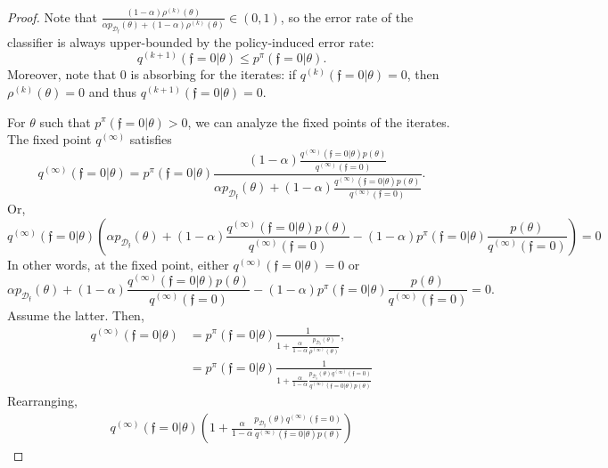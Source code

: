 \documentclass[10pt,a4paper]{amsart}
\newcommand{\MeasuredCISet}{\mathcal{D}_{\feas{}}}
\newcommand{\feas}{\mathfrak{f}}
\begin{document}
\begin{proof}
Note that $\frac{ (1-\alpha) \rho^{(k)}(\theta) }{ \alpha p_{\MeasuredCISet}(\theta) + (1-\alpha) \rho^{(k)}(\theta) } \in (0, 1)$, so the error rate of the classifier is always upper-bounded by the policy-induced error rate:
\begin{equation}
    q^{(k+1)}(\feas{}=0 | \theta) \leq p^\pi(\feas{}=0 | \theta).
\end{equation}
Moreover, note that $0$ is absorbing for the iterates: if $q^{(k)}(\feas{}=0 | \theta) = 0$, then $\rho^{(k)}(\theta) = 0$ and thus $q^{(k+1)}(\feas{}=0 | \theta) = 0$.

For $\theta$ such that $p^\pi(\feas{}=0 | \theta) > 0$, we can analyze the fixed points of the iterates. The fixed point $q^{(\infty)}$ satisfies
\begin{equation}
    q^{(\infty)}(\feas{}=0 | \theta) = p^\pi(\feas{}=0 | \theta) \frac{ (1-\alpha) \frac{q^{(\infty)}(\feas{}=0|\theta) p(\theta) }{q^{(\infty)}(\feas{}=0)} }{ \alpha p_{\MeasuredCISet}(\theta) + (1-\alpha) \frac{q^{(\infty)}(\feas{}=0|\theta) p(\theta)}{q^{(\infty)}(\feas{}=0)} }.
\end{equation}
Or,
\begin{equation}
    q^{(\infty)}(\feas{}=0 | \theta)
    \left( \alpha p_{\MeasuredCISet}(\theta) + (1 - \alpha) \frac{ q^{(\infty)}(\feas{}=0|\theta) p(\theta) }{ q^{(\infty)}(\feas{}=0) } - (1-\alpha) p^\pi(\feas{}=0|\theta) \frac{p(\theta)}{q^{(\infty)}(\feas{}=0)} \right) = 0
\end{equation}
In other words, at the fixed point, either $q^{(\infty)}(\feas{}=0 | \theta) = 0$ or
\begin{equation}
    \alpha p_{\MeasuredCISet}(\theta) + (1 - \alpha) \frac{ q^{(\infty)}(\feas{}=0|\theta) p(\theta) }{ q^{(\infty)}(\feas{}=0) } - (1-\alpha) p^\pi(\feas{}=0|\theta) \frac{p(\theta)}{q^{(\infty)}(\feas{}=0)} = 0.
\end{equation}
Assume the latter. Then,
\begin{align}
    q^{(\infty)}(\feas{}=0 | \theta)
    &= p^\pi(\feas{}=0 | \theta) \frac{1}{1 + \frac{\alpha}{1-\alpha} \frac{ p_{\MeasuredCISet}(\theta) }{ \rho^{(\infty)}(\theta) } }, \\
    &= p^\pi(\feas{}=0 | \theta) \frac{1}{1 + \frac{\alpha}{1-\alpha} \frac{ p_{\MeasuredCISet}(\theta) q^{(\infty)}(\feas{} = 0) }{ q^{(\infty)}(\feas{}=0 | \theta) p(\theta) } }
\end{align}
Rearranging,
\begin{align}
    q^{(\infty)}(\feas{}=0 | \theta) \left(1 + \frac{\alpha}{1-\alpha} \frac{ p_{\MeasuredCISet}(\theta) q^{(\infty)}(\feas{} = 0) }{ q^{(\infty)}(\feas{}=0 | \theta) p(\theta) } \right)

\end{align}
\end{proof}
\end{document}
